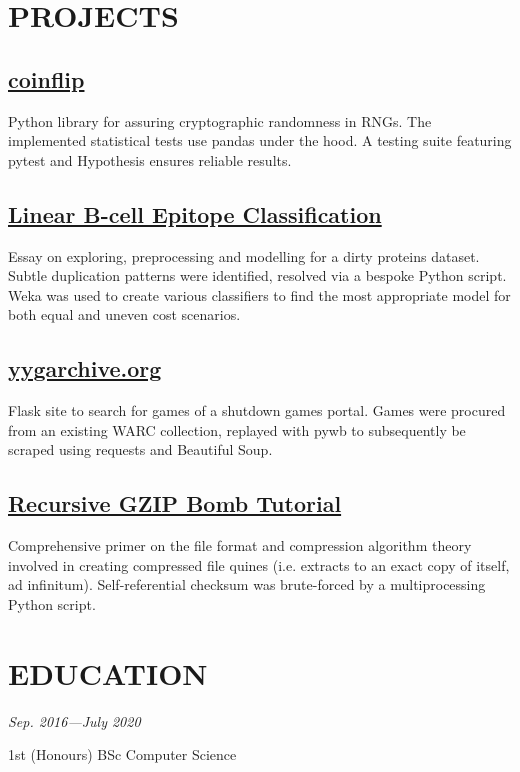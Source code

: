\documentclass[11pt]{article}
\newcommand{\fakesubsection}[1]{\large{\subsectionfont{#1}}}
\begin{document}
\section*{PROJECTS}

\subsection*{\href{https://github.com/honno/coinflip/}{coinflip}}

Python library for assuring cryptographic randomness in RNGs. The implemented statistical tests use pandas under the hood. A testing suite featuring pytest and Hypothesis ensures reliable results.

\subsection*{\href{https://github.com/honno/epitope-classification}{Linear B-cell Epitope Classification}}

Essay on exploring, preprocessing and modelling for a dirty proteins dataset. Subtle duplication patterns  were identified, resolved via a bespoke Python script. Weka was used to create various classifiers to find the most appropriate model for both equal and uneven cost scenarios.

%

\subsection*{\href{https://www.yygarchive.org/}{yygarchive.org}}

Flask site to search for games of a shutdown games portal. Games were procured from an existing WARC collection, replayed with pywb to subsequently be scraped using requests and Beautiful Soup.

\subsection*{\href{https://honno.dev/gzip-quine/}{Recursive GZIP Bomb Tutorial}}

Comprehensive primer on the file format and compression algorithm theory involved in creating compressed file quines (i.e. extracts to an exact copy of itself, ad infinitum). Self-referential checksum was brute-forced by a multiprocessing Python script.

\section*{EDUCATION}

\fakesubsection{Aston University} \hfill {\small\textit{Sep. 2016—July 2020}}

1st (Honours) BSc Computer Science
\end{document}
